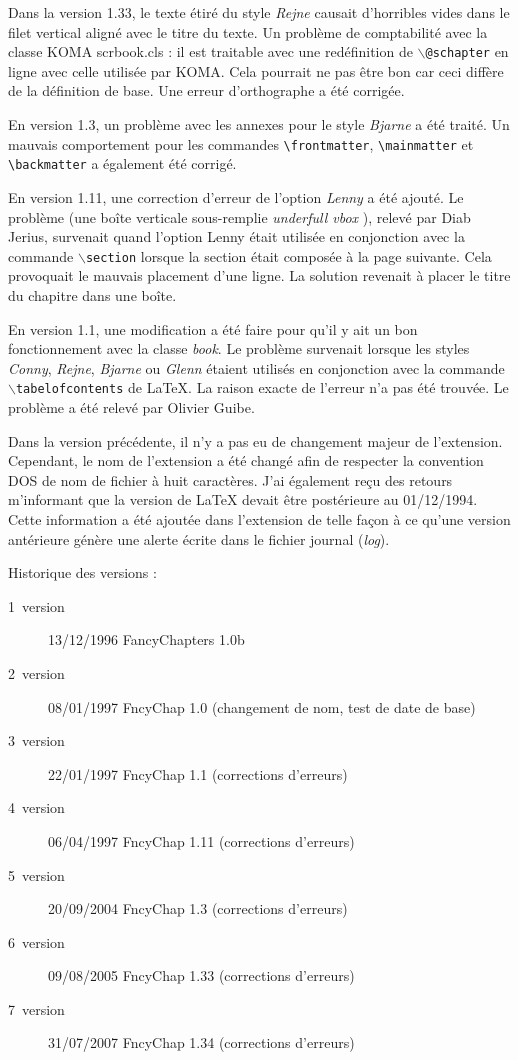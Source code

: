 \documentclass{report}
\newcommand{\A}[1]{{$\backslash${\tt #1}}}
\begin{document}
    Dans la version 1.33, le texte étiré du style \emph{Rejne} causait 
    d'horribles vides dans le filet vertical aligné avec le titre du texte. Un 
    problème de comptabilité avec la classe KOMA \og scrbook.cls \fg{} : il 
    est traitable avec une redéfinition de \A{@schapter} en ligne avec celle 
    utilisée par KOMA. Cela pourrait ne pas être bon car ceci diffère de la
    définition de base. Une erreur d'orthographe a été corrigée.

    En version 1.3, un problème avec les annexes pour le style \emph{Bjarne} a 
    été traité. Un mauvais comportement pour les commandes 
    \verb+\frontmatter+, \verb+\mainmatter+ et \verb+\backmatter+ a également 
    été corrigé.

    En version 1.11, une correction d'erreur de l'option \emph{Lenny} a été 
    ajouté. Le problème (une boîte verticale sous-remplie \og \emph{underfull vbox} 
    \fg{}), relevé par Diab Jerius, survenait quand l'option Lenny était 
    utilisée en conjonction avec la commande \A{section} lorsque la section
    était composée à la page suivante. Cela provoquait le mauvais placement 
    d'une ligne. La solution revenait à placer le titre du chapitre dans une
    boîte.

    En version 1.1, une modification a été faire pour qu'il y ait un bon 
    fonctionnement avec la classe \emph{book}. Le problème survenait lorsque 
    les styles \emph{Conny}, \emph{Rejne}, \emph{Bjarne} ou \emph{Glenn} 
    étaient utilisés en conjonction avec la commande  \A{tabelofcontents} 
    de \LaTeX{}. La raison exacte de l'erreur n'a pas été trouvée. Le 
    problème a été relevé par Olivier Guibe.

    Dans la version précédente, il n'y a pas eu de changement majeur de 
    l'extension. Cependant, le nom de l'extension a été changé afin de 
    respecter la convention DOS de nom de fichier à huit caractères. J'ai
    également reçu des retours m'informant que la version de \LaTeX{} devait
    être postérieure au 01/12/1994. Cette information a été ajoutée dans 
    l'extension de telle façon à ce qu'une version antérieure génère une
    alerte écrite dans le fichier journal (\emph{log}).

    Historique des versions :
      \begin{description}
        \item[1\iere\ version] 13/12/1996 FancyChapters 1.0b
        \item[2\ieme\ version] 08/01/1997 FncyChap 1.0 (changement de nom, test de 
          date de base)
        \item[3\ieme\ version] 22/01/1997 FncyChap 1.1 (corrections d'erreurs)
        \item[4\ieme\ version] 06/04/1997 FncyChap 1.11 (corrections d'erreurs)
        \item[5\ieme\ version] 20/09/2004 FncyChap 1.3 (corrections d'erreurs)
        \item[6\ieme\ version] 09/08/2005 FncyChap 1.33 (corrections d'erreurs)
        \item[7\ieme\ version] 31/07/2007 FncyChap 1.34 (corrections d'erreurs)
      \end{description}
\end{document}
